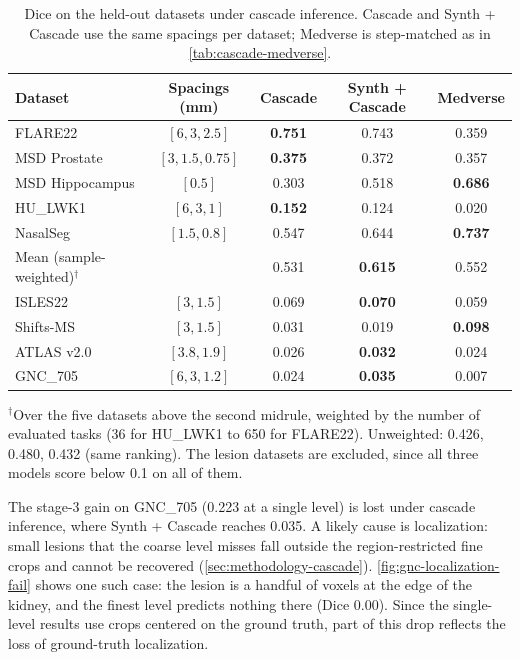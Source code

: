 \documentclass[hidelinks, a4paper, 12pt, ngerman, english]{article}  %
\begin{document}
\begin{table}[t]
  \centering
  \small
  \caption{Dice on the held-out datasets under cascade inference. Cascade and
  Synth + Cascade use the same spacings per dataset; Medverse is step-matched
  as in \autoref{tab:cascade-medverse}.}
  \label{tab:synth-cascade-realhost}
  \begin{tabular}{@{}lcccc@{}}
    \toprule
    Dataset & Spacings (mm) & Cascade & Synth + Cascade & Medverse \\
    \midrule
    FLARE22         & $[6, 3, 2.5]$    & \textbf{0.751} & 0.743 & 0.359 \\
    MSD Prostate    & $[3, 1.5, 0.75]$ & \textbf{0.375} & 0.372 & 0.357 \\
    MSD Hippocampus & $[0.5]$          & 0.303 & 0.518 & \textbf{0.686} \\
    HU\_LWK1        & $[6, 3, 1]$      & \textbf{0.152} & 0.124 & 0.020 \\
    NasalSeg        & $[1.5, 0.8]$     & 0.547 & 0.644 & \textbf{0.737} \\
    \midrule
    Mean (sample-weighted)$^{\dagger}$ & & 0.531 & \textbf{0.615} & 0.552 \\
    \midrule
    ISLES22         & $[3, 1.5]$       & 0.069 & \textbf{0.070} & 0.059 \\
    Shifts-MS       & $[3, 1.5]$       & 0.031 & 0.019 & \textbf{0.098} \\
    ATLAS v2.0      & $[3.8, 1.9]$     & 0.026 & \textbf{0.032} & 0.024 \\
    GNC\_705        & $[6, 3, 1.2]$    & 0.024 & \textbf{0.035} & 0.007 \\
    \bottomrule
  \end{tabular}
  \par\vspace{0.5em}
  \raggedright\footnotesize
  $^{\dagger}$Over the five datasets above the second midrule, weighted by the
  number of evaluated tasks (36 for HU\_LWK1 to 650 for FLARE22). Unweighted:
  0.426, 0.480, 0.432 (same ranking). The lesion datasets are excluded, since
  all three models score below 0.1 on all of them.
\end{table}

The stage-3 gain on GNC\_705 (0.223 at a single level) is lost under cascade
inference, where Synth + Cascade reaches 0.035. A likely cause is
localization: small lesions that the coarse level misses fall outside the
region-restricted fine crops and cannot be recovered
(\autoref{sec:methodology-cascade}). \autoref{fig:gnc-localization-fail} shows
one such case: the lesion is a handful of voxels at the edge of the kidney,
and the finest level predicts nothing there (Dice 0.00). Since the single-level results use crops centered on the ground truth, part of this drop reflects the loss of ground-truth localization.
\end{document}
